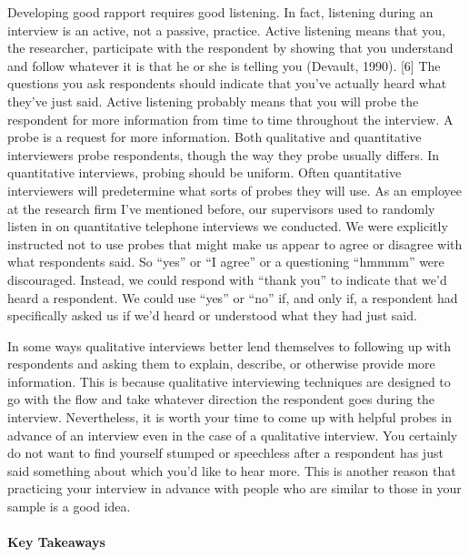Developing good rapport requires good listening. In fact, listening during an interview is an active, not a passive, practice. Active listening means that you, the researcher, participate with the respondent by showing that you understand and follow whatever it is that he or she is telling you (Devault, 1990). [6] The questions you ask respondents should indicate that you’ve actually heard what they’ve just said. Active listening probably means that you will probe the respondent for more information from time to time throughout the interview. A probe is a request for more information. Both qualitative and quantitative interviewers probe respondents, though the way they probe usually differs. In quantitative interviews, probing should be uniform. Often quantitative interviewers will predetermine what sorts of probes they will use. As an employee at the research firm I’ve mentioned before, our supervisors used to randomly listen in on quantitative telephone interviews we conducted. We were explicitly instructed not to use probes that might make us appear to agree or disagree with what respondents said. So “yes” or “I agree” or a questioning “hmmmm” were discouraged. Instead, we could respond with “thank you” to indicate that we’d heard a respondent. We could use “yes” or “no” if, and only if, a respondent had specifically asked us if we’d heard or understood what they had just said.

In some ways qualitative interviews better lend themselves to following up with respondents and asking them to explain, describe, or otherwise provide more information. This is because qualitative interviewing techniques are designed to go with the flow and take whatever direction the respondent goes during the interview. Nevertheless, it is worth your time to come up with helpful probes in advance of an interview even in the case of a qualitative interview. You certainly do not want to find yourself stumped or speechless after a respondent has just said something about which you’d like to hear more. This is another reason that practicing your interview in advance with people who are similar to those in your sample is a good idea.


\paragraph{Key Takeaways}

